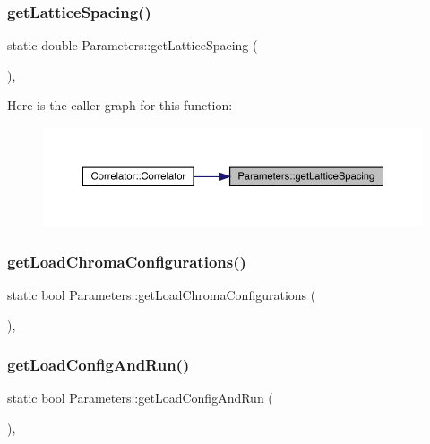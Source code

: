 \subsubsection{\texorpdfstring{getLatticeSpacing()}{getLatticeSpacing()}}
{\footnotesize\ttfamily static double Parameters\+::get\+Lattice\+Spacing (\begin{DoxyParamCaption}{ }\end{DoxyParamCaption})\hspace{0.3cm}{\ttfamily [inline]}, {\ttfamily [static]}}

Here is the caller graph for this function\+:\nopagebreak
\begin{figure}[H]
\begin{center}
\leavevmode
\includegraphics[width=350pt]{class_parameters_aabe7e3a2468cf11bb5e98e626cb94ff2_icgraph}
\end{center}
\end{figure}
\mbox{\label{class_parameters_a35eef818713a6f5ae20d67e7d64bec2f}} 
\subsubsection{\texorpdfstring{getLoadChromaConfigurations()}{getLoadChromaConfigurations()}}
{\footnotesize\ttfamily static bool Parameters\+::get\+Load\+Chroma\+Configurations (\begin{DoxyParamCaption}{ }\end{DoxyParamCaption})\hspace{0.3cm}{\ttfamily [inline]}, {\ttfamily [static]}}

\mbox{\label{class_parameters_a7870fae41b172caee9fa020c86d056ac}} 
\subsubsection{\texorpdfstring{getLoadConfigAndRun()}{getLoadConfigAndRun()}}
{\footnotesize\ttfamily static bool Parameters\+::get\+Load\+Config\+And\+Run (\begin{DoxyParamCaption}{ }\end{DoxyParamCaption})\hspace{0.3cm}{\ttfamily [inline]}, {\ttfamily [static]}}

